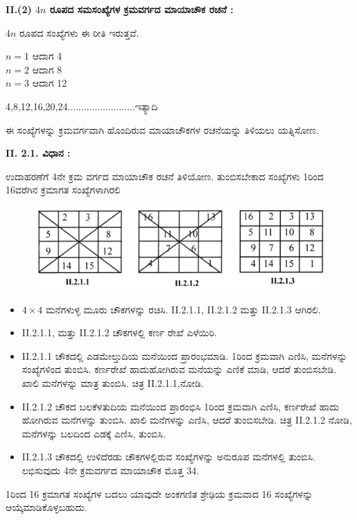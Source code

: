 \textbf{II.(2) $4n$ ರೂಪದ ಸಮಸಂಖ್ಯೆಗಳ ಕ್ರಮವರ್ಗದ ಮಾಯಾಚೌಕ ರಚನೆ :}

$4n$ ರೂಪದ ಸಂಖ್ಯೆಗಳು ಈ ರೀತಿ ಇರುತ್ತವೆ.

\begin{center}
$n=1$ ಆದಾಗ 4\\
$n=2$ ಆದಾಗ 8\\
$n=3$ ಆದಾಗ 12
\end{center}
4,8,12,16,20,24.........................ಇತ್ಯಾದಿ

ಈ ಸಂಖ್ಯೆಗಳನ್ನು ಕ್ರಮವರ್ಗವಾಗಿ ಹೊಂದಿರುವ ಮಾಯಾಚೌಕಗಳ ರಚನೆಯನ್ನು ತಿಳಿಯಲು ಯತ್ನಿಸೋಣ.

\textbf{II. 2.1. ವಿಧಾನ :}

ಉದಾಹರಣೆಗೆ 4ನೇ ಕ್ರಮ ವರ್ಗದ ಮಾಯಾಚೌಕ ರಚನೆ ತಿಳಿಯೋಣ. ತುಂಬಿಸಬೇಕಾದ ಸಂಖ್ಯೆಗಳು 1ರಿಂದ 16ವರೆಗಿನ ಕ್ರಮಾಗತ ಸಂಖ್ಯೆಗಳಾಗಿರಲಿ
\begin{figure}[h]
\includegraphics{src/figures/chap3/fig3.16.jpg}
\end{figure}

\begin{itemize}
	\item $4 \times 4$ ಮನೆಗಳುಳ್ಳ ಮೂರು ಚೌಕಗಳನ್ನು ರಚಿಸಿ. II.2.1.1, II.2.1.2 ಮತ್ತು II.2.1.3 ಆಗಿರಲಿ.
	\item II.2.1.1, ಮತ್ತು II.2.1.2 ಚೌಕಗಳಲ್ಲಿ ಕರ್ಣ ರೇಖೆ ಎಳೆಯಿರಿ.
	\item II.2.1.1 ಚೌಕದಲ್ಲಿ ಎಡಮೇಲ್ತುದಿಯ ಮನೆಯಿಂದ ಪ್ರಾರಂಭಮಾಡಿ. 1ರಿಂದ ಕ್ರಮವಾಗಿ ಎಣಿಸಿ, ಮನೆಗಳನ್ನು ಸಂಖ್ಯೆಗಳಿಂದ ತುಂಬಿಸಿ. ಕರ್ಣರೇಖೆ ಹಾದುಹೋಗಿರುವ ಮನೆಯನ್ನು ಎಣಿಕೆ ಮಾಡಿ, ಆದರೆ ತುಂಬಿಸಬೇಡಿ. ಖಾಲಿ ಮನೆಗಳನ್ನು ಮಾತ್ರ ತುಂಬಿಸಿ. ಚಿತ್ರ II.2.1.1,ನೋಡಿ.
	\item II.2.1.2 ಚೌಕದ ಬಲಕೆಳತುದಿಯ ಮನೆಯಿಂದ ಪ್ರಾರಂಭಿಸಿ 1ರಿಂದ ಕ್ರಮವಾಗಿ ಎಣಿಸಿ, ಕರ್ಣರೇಖೆ ಹಾದು ಹೋಗಿರುವ ಮನೆಗಳನ್ನು ತುಂಬಿಸಿ. ಖಾಲಿ ಮನೆಗಳನ್ನು ಎಣಿಸಿ, ಆದರೆ ತುಂಬಿಸಬೇಡಿ. ಚಿತ್ರ II.2.1.2 ನೋಡಿ, ಮನೆಗಳನ್ನು ಬಲದಿಂದ ಎಡಕ್ಕೆ ಎಣಿಸಿ, ತುಂಬಿಸಿ.
	\item II.2.1.3 ಚೌಕದಲ್ಲಿ ಉಳಿದೆರಡು ಚೌಕಗಳಲ್ಲಿರುವ ಸಂಖ್ಯೆಗಳನ್ನು ಅನುರೂಪ ಮನೆಗಳಲ್ಲಿ ತುಂಬಿಸಿ. ಲಭಿಸುವುದು 4ನೇ ಕ್ರಮವರ್ಗದ ಮಾಯಾಚೌಕ ಮೊತ್ತ 34.
\end{itemize}

1ರಿಂದ 16 ಕ್ರಮಾಗತ ಸಂಖ್ಯೆಗಳ ಬದಲು ಯಾವುದೇ ಅಂಕಗಣಿತ ಶ್ರೇಢಿಯ ಕ್ರಮವಾದ 16 ಸಂಖ್ಯೆಗಳನ್ನು ಆಯ್ಕೆಮಾಡಿಕೊಳ್ಳಬಹುದು.

